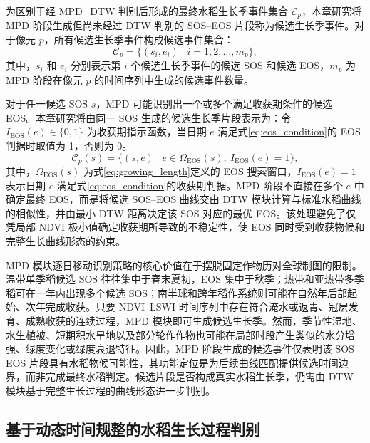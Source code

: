 为区别于经 MPD\_DTW 判别后形成的最终水稻生长季事件集合 \(\mathcal{E}_p\)，本章研究将 MPD 阶段生成但尚未经过 DTW 判别的 SOS--EOS 片段称为候选生长季事件。对于像元 \(p\)，所有候选生长季事件构成候选事件集合：
\begin{equation}
    \mathcal{C}_p = \{(s_i, e_i)\mid i=1,2,\ldots,m_p\},
    \label{eq:candidate_event_set}
\end{equation}
其中，\(s_i\) 和 \(e_i\) 分别表示第 \(i\) 个候选生长季事件的候选 SOS 和候选 EOS，\(m_p\) 为 MPD 阶段在像元 \(p\) 的时间序列中生成的候选事件数量。

对于任一候选 SOS \(s\)，MPD 可能识别出一个或多个满足收获期条件的候选 EOS。本章研究将由同一 SOS 生成的候选生长季片段表示为：令 \(I_{\mathrm{EOS}}(e)\in\{0,1\}\) 为收获期指示函数，当日期 \(e\) 满足式\ref{eq:eos_condition}的 EOS 判据时取值为 1，否则为 0。
\begin{equation}
    \mathcal{C}_p(s)=\{(s,e)\mid e\in\Omega_{\mathrm{EOS}}(s),\ I_{\mathrm{EOS}}(e)=1\},
    \label{eq:candidate_set}
\end{equation}
其中，\(\Omega_{\mathrm{EOS}}(s)\) 为式\ref{eq:growing_length}定义的 EOS 搜索窗口，\(I_{\mathrm{EOS}}(e)=1\) 表示日期 \(e\) 满足式\ref{eq:eos_condition}的收获期判据。MPD 阶段不直接在多个 \(e\) 中确定最终 EOS，而是将候选 SOS--EOS 曲线交由 DTW 模块计算与标准水稻曲线的相似性，并由最小 DTW 距离决定该 SOS 对应的最优 EOS。该处理避免了仅凭局部 NDVI 极小值确定收获期所导致的不稳定性，使 EOS 同时受到收获物候和完整生长曲线形态的约束。

MPD 模块逐日移动识别策略的核心价值在于摆脱固定作物历对全球制图的限制。温带单季稻候选 SOS 往往集中于春末夏初，EOS 集中于秋季；热带和亚热带多季稻可在一年内出现多个候选 SOS；南半球和跨年稻作系统则可能在自然年后部起始、次年完成收获。只要 NDVI--LSWI 时间序列中存在符合淹水或返青、冠层发育、成熟收获的连续过程，MPD 模块即可生成候选生长季。然而，季节性湿地、水生植被、短期积水旱地以及部分轮作作物也可能在局部时段产生类似的水分增强、绿度变化或绿度衰退特征\cite{Zhan2021}。因此，MPD 阶段生成的候选事件仅表明该 SOS--EOS 片段具有水稻物候可能性，其功能定位是为后续曲线匹配提供候选时间边界，而非完成最终水稻判定。候选片段是否构成真实水稻生长季，仍需由 DTW 模块基于完整生长过程的曲线形态进一步判别。

\subsection{基于动态时间规整的水稻生长过程判别}

\label{sec:dtw}

